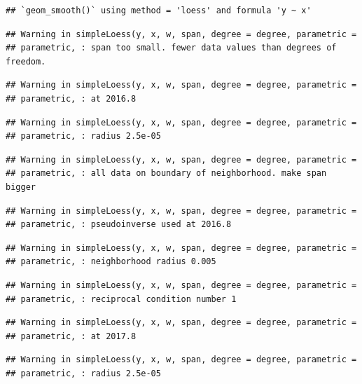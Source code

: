\documentclass[]{article}
\begin{document}
\begin{verbatim}
## `geom_smooth()` using method = 'loess' and formula 'y ~ x'
\end{verbatim}

\begin{verbatim}
## Warning in simpleLoess(y, x, w, span, degree = degree, parametric =
## parametric, : span too small. fewer data values than degrees of freedom.
\end{verbatim}

\begin{verbatim}
## Warning in simpleLoess(y, x, w, span, degree = degree, parametric =
## parametric, : at 2016.8
\end{verbatim}

\begin{verbatim}
## Warning in simpleLoess(y, x, w, span, degree = degree, parametric =
## parametric, : radius 2.5e-05
\end{verbatim}

\begin{verbatim}
## Warning in simpleLoess(y, x, w, span, degree = degree, parametric =
## parametric, : all data on boundary of neighborhood. make span bigger
\end{verbatim}

\begin{verbatim}
## Warning in simpleLoess(y, x, w, span, degree = degree, parametric =
## parametric, : pseudoinverse used at 2016.8
\end{verbatim}

\begin{verbatim}
## Warning in simpleLoess(y, x, w, span, degree = degree, parametric =
## parametric, : neighborhood radius 0.005
\end{verbatim}

\begin{verbatim}
## Warning in simpleLoess(y, x, w, span, degree = degree, parametric =
## parametric, : reciprocal condition number 1
\end{verbatim}

\begin{verbatim}
## Warning in simpleLoess(y, x, w, span, degree = degree, parametric =
## parametric, : at 2017.8
\end{verbatim}

\begin{verbatim}
## Warning in simpleLoess(y, x, w, span, degree = degree, parametric =
## parametric, : radius 2.5e-05
\end{verbatim}
\end{document}
